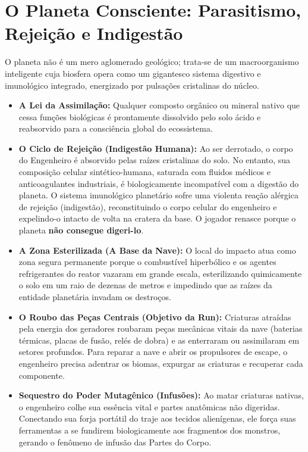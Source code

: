 \documentclass[a4paper,12pt]{report}
\begin{document}
\section{O Planeta Consciente: Parasitismo, Rejeição e Indigestão}
O planeta não é um mero aglomerado geológico; trata-se de um macroorganismo inteligente cuja biosfera opera como um gigantesco sistema digestivo e imunológico integrado, energizado por pulsações cristalinas do núcleo.
\begin{itemize}
    \item \textbf{A Lei da Assimilação:} Qualquer composto orgânico ou mineral nativo que cessa funções biológicas é prontamente dissolvido pelo solo ácido e reabsorvido para a consciência global do ecossistema.
    \item \textbf{O Ciclo de Rejeição (Indigestão Humana):} Ao ser derrotado, o corpo do Engenheiro é absorvido pelas raízes cristalinas do solo. No entanto, sua composição celular sintético-humana, saturada com fluidos médicos e anticoagulantes industriais, é biologicamente incompatível com a digestão do planeta. O sistema imunológico planetário sofre uma violenta reação alérgica de rejeição (indigestão), reconstituindo o corpo celular do engenheiro e expelindo-o intacto de volta na cratera da base. O jogador renasce porque o planeta \textbf{não consegue digeri-lo}.
    \item \textbf{A Zona Esterilizada (A Base da Nave):} O local do impacto atua como zona segura permanente porque o combustível hiperbólico e os agentes refrigerantes do reator vazaram em grande escala, esterilizando quimicamente o solo em um raio de dezenas de metros e impedindo que as raízes da entidade planetária invadam os destroços.
    \item \textbf{O Roubo das Peças Centrais (Objetivo da Run):} Criaturas atraídas pela energia dos geradores roubaram peças mecânicas vitais da nave (baterias térmicas, placas de fusão, relés de dobra) e as enterraram ou assimilaram em setores profundos. Para reparar a nave e abrir os propulsores de escape, o engenheiro precisa adentrar os biomas, expurgar as criaturas e recuperar cada componente.
    \item \textbf{Sequestro do Poder Mutagênico (Infusões):} Ao matar criaturas nativas, o engenheiro colhe sua essência vital e partes anatômicas não digeridas. Conectando sua forja portátil do traje aos tecidos alienígenas, ele força suas ferramentas a se fundirem biologicamente aos fragmentos dos monstros, gerando o fenômeno de infusão das Partes do Corpo.
\end{itemize}
\end{document}
